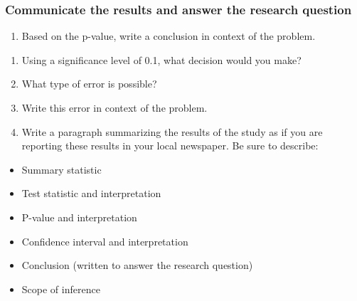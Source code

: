 \documentclass[
]{report}
\providecommand{\tightlist}{%
  \setlength{\itemsep}{0pt}\setlength{\parskip}{0pt}}
\begin{document}
\hypertarget{communicate-the-results-and-answer-the-research-question-7}{%
\subsubsection*{Communicate the results and answer the research question}\label{communicate-the-results-and-answer-the-research-question-7}}

\begin{enumerate}
\def\labelenumi{\arabic{enumi}.}
\setcounter{enumi}{12}
\tightlist
\item
  Based on the p-value, write a conclusion in context of the problem.
\end{enumerate}

\vspace{.8in}

\begin{enumerate}
\def\labelenumi{\arabic{enumi}.}
\setcounter{enumi}{13}
\item
  Using a significance level of 0.1, what decision would you make?
  \vspace{0.2in}
\item
  What type of error is possible?
  \vspace{0.3in}
\item
  Write this error in context of the problem.
  \vspace{0.8in}
\item
  Write a paragraph summarizing the results of the study as if you are reporting these results in your local newspaper. Be sure to describe:
\end{enumerate}

\begin{itemize}
\item
  Summary statistic
\item
  Test statistic and interpretation
\item
  P-value and interpretation
\item
  Confidence interval and interpretation
\item
  Conclusion (written to answer the research question)
\item
  Scope of inference
\end{itemize}

\vspace{3in}
\end{document}
